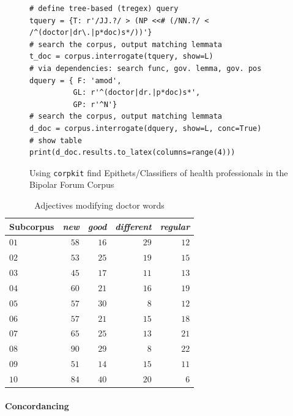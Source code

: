 \begin{figure}[htb]
\begin{verbatim}
# define tree-based (tregex) query
tquery = {T: r'/JJ.?/ > (NP <<# (/NN.?/ < /^(doctor|dr\.|p*doc)s*/))'}
# search the corpus, output matching lemmata
t_doc = corpus.interrogate(tquery, show=L)
# via dependencies: search func, gov. lemma, gov. pos
dquery = { F: 'amod',
          GL: r'^(doctor|dr.|p*doc)s*',
          GP: r'^N'}
# search the corpus, output matching lemmata
d_doc = corpus.interrogate(dquery, show=L, conc=True)
# show table
print(d_doc.results.to_latex(columns=range(4)))
\end{verbatim}
\caption[Using the \texttt{corpkit} API]{Using \texttt{corpkit} find Epithets\slash Classifiers of health professionals in the Bipolar Forum Corpus}
\label{fig:mod-of-doc}
\end{figure}

\FloatBarrier


\begin{table}[htb]
\centering
\small
\begin{tabular}{lrrrr}

\toprule
Subcorpus &  \emph{new} &  \emph{good} &  \emph{different} &  \emph{regular} \\
\midrule
$01$ &   $58$ &    $16$ &         $29$ &       $12$ \\
$02$ &   $53$ &    $25$ &         $19$ &       $15$ \\
$03$ &   $45$ &    $17$ &         $11$ &       $13$ \\
$04$ &   $60$ &    $21$ &         $16$ &       $19$ \\
$05$ &   $57$ &    $30$ &         $ 8$ &       $12$ \\
$06$ &   $57$ &    $21$ &         $15$ &       $18$ \\
$07$ &   $65$ &    $25$ &         $13$ &       $21$ \\
$08$ &   $90$ &    $29$ &         $ 8$ &       $22$ \\
$09$ &   $51$ &    $14$ &         $15$ &       $11$ \\
$10$ &   $84$ &    $40$ &         $20$ &       $ 6$ \\
\bottomrule
\end{tabular}
\caption{Adjectives modifying doctor words}
\label{conc:adj_mod_doc_example}
\end{table}

\paragraph{Concordancing}


